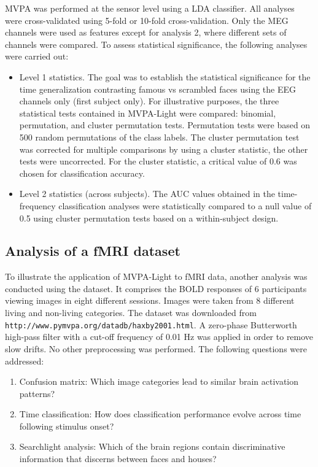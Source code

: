 \documentclass[utf8]{frontiersSCNS} %
\newcommand{\ttt}[1]{\texttt{#1}}
\begin{document}
MVPA was performed at the sensor level using a LDA classifier. All analyses were cross-validated using 5-fold or 10-fold cross-validation. Only the MEG channels were used as features except for analysis 2, where different sets of channels were compared. To assess statistical significance, the following analyses were carried out:

\begin{itemize}
    \item Level 1 statistics. The goal was to establish the statistical significance for the time generalization contrasting famous vs scrambled faces using the EEG channels only (first subject only). For illustrative purposes, the three statistical tests contained in MVPA-Light were compared: binomial, permutation, and cluster permutation tests. Permutation tests were based on 500 random permutations of the class labels. The cluster permutation test was corrected for multiple comparisons by using a cluster statistic, the other tests were uncorrected. For the cluster statistic, a critical value of 0.6 was chosen for  classification accuracy.
    \item Level 2 statistics (across subjects). The AUC values obtained in the time-frequency classification analyses were statistically compared to a null value of 0.5 using cluster permutation tests based on a within-subject design.
    
\end{itemize}

\subsection{Analysis of a fMRI dataset}
To illustrate the application of MVPA-Light to fMRI data, another analysis was conducted using the \cite{Haxby2001} dataset. It comprises the BOLD responses of 6 participants viewing images in eight different sessions. Images were taken from 8 different living and non-living categories. The dataset was downloaded from \ttt{http://www.pymvpa.org/datadb/haxby2001.html}. A zero-phase Butterworth high-pass filter with a cut-off frequency of 0.01 Hz was applied in order to remove slow drifts. No other preprocessing was performed. The following questions were addressed:

\begin{enumerate}
    \item Confusion matrix: Which image categories lead to similar brain activation patterns?
    \item Time classification: How does classification performance evolve across time following stimulus onset?
    \item Searchlight analysis: Which of the brain regions contain discriminative information that discerns between faces and houses?
\end{enumerate}
\end{document}
